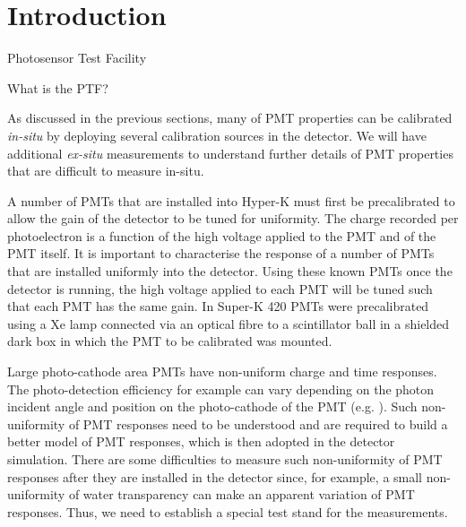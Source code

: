 \section{Introduction}

Photosensor Test Facility

What is the PTF? 




As discussed in the previous sections, many of PMT properties can be
calibrated {\it in-situ} by deploying several calibration sources in
the detector.
%
We will have additional {\it ex-situ} measurements to understand
further details of PMT properties that are difficult to measure
in-situ.

A number of PMTs that are installed into Hyper-K must first be
precalibrated to allow the gain of the detector to be tuned for
uniformity. The charge recorded per photoelectron is a function of the
high voltage applied to the PMT and of the PMT itself. It is important
to characterise the response of a number of PMTs that are installed
uniformly into the detector. Using these known PMTs once the detector
is running, the high voltage applied to each PMT will be tuned such
that each PMT has the same gain. In Super-K 420 PMTs were
precalibrated using a Xe lamp connected via an optical fibre to a
scintillator ball in a shielded dark box in which the PMT to be
calibrated was mounted.

Large photo-cathode area PMTs have non-uniform charge and time
responses.  The photo-detection efficiency for example can vary
depending on the photon incident angle and position on the
photo-cathode of the PMT (e.g. \cite{Goon:2012if}).
%
Such non-uniformity of PMT responses need to be understood and are
required to build a better model of PMT responses, which is then
adopted in the detector simulation.
%
There are some difficulties to measure such non-uniformity of PMT
responses after they are installed in the detector since, for example,
a small non-uniformity of water transparency can make an apparent
variation of PMT responses.
%
Thus, we need to establish a special test stand for the measurements.
%

